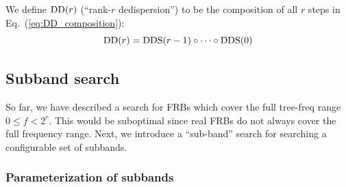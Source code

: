 \documentclass{article}
\numberwithin{equation}{section}   %
\def\DDS{{\rm DDS}}
\def\DD{{\rm DD}}
\begin{document}
\par\noindent
We define $\DD(r)$ (``rank-$r$ dedispersion'') to be the composition of all $r$ steps in Eq.\ (\ref{eq:DD_composition}):
\begin{equation}
\DD(r) = \DDS(r-1) \circ \cdots \circ \DDS(0)  \label{eq:DD_DS}
\end{equation}

\subsection{Subband search}
\label{sec:subband_search}

So far, we have described a search for FRBs which cover the full tree-freq range $0 \le f < 2^r$.
This would be suboptimal since real FRBs do not always cover the full frequency range.
Next, we introduce a ``sub-band'' search for searching a configurable set of subbands.

\subsubsection{Parameterization of subbands}
\end{document}
